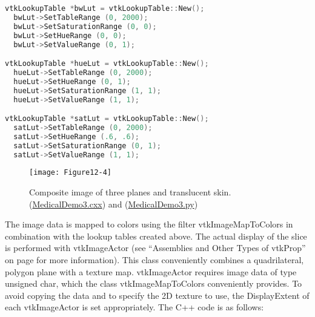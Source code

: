 \begin{lstlisting}[language=C++, caption={Lookup tables for the sectioning planes.}]
vtkLookupTable *bwLut = vtkLookupTable::New();
  bwLut->SetTableRange (0, 2000);
  bwLut->SetSaturationRange (0, 0);
  bwLut->SetHueRange (0, 0);
  bwLut->SetValueRange (0, 1);

vtkLookupTable *hueLut = vtkLookupTable::New();
  hueLut->SetTableRange (0, 2000);
  hueLut->SetHueRange (0, 1);
  hueLut->SetSaturationRange (1, 1);
  hueLut->SetValueRange (1, 1);

vtkLookupTable *satLut = vtkLookupTable::New();
  satLut->SetTableRange (0, 2000);
  satLut->SetHueRange (.6, .6);
  satLut->SetSaturationRange (0, 1);
  satLut->SetValueRange (1, 1);
\end{lstlisting}

\begin{figure}[!htb]
	\centering
	\texttt{[image: Figure12-4]}
	\caption{Composite image of three planes and translucent skin.(\href{https://lorensen.github.io/VTKExamples/site/Cxx/Medical/MedicalDemo3/}{MedicalDemo3.cxx}) and (\href{https://lorensen.github.io/VTKExamples/site/Python/Medical/MedicalDemo3/}{MedicalDemo3.py})}
	\label{fig:Figure12-4}
\end{figure}

The image data is mapped to colors using the filter vtkImageMapToColors in combination with the lookup tables created above. The actual display of the slice is performed with vtkImageActor (see ``Assemblies and Other Types of vtkProp'' on page \pageref{subsec:assemblies_vtkprop} for more information). This class conveniently combines a quadrilateral, polygon plane with a texture map. vtkImageActor requires image data of type unsigned char, which the class vtkImageMapToColors conveniently provides. To avoid copying the data and to specify the 2D texture to use, the DisplayExtent of each vtkImageActor is set appropriately. The C++ code is as follows:

